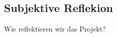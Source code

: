 \subsection{Subjektive Reflekion}
\label{sec:SubjektiveReflekion}

Wie reflektieren wir das Projekt?
